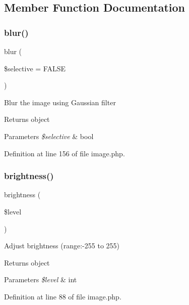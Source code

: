 \subsection{Member Function Documentation}
\hypertarget{class_image_acdca850837eae7c01092f833157ace57}{}\label{class_image_acdca850837eae7c01092f833157ace57} 
\subsubsection{\texorpdfstring{blur()}{blur()}}
{\footnotesize\ttfamily blur (\begin{DoxyParamCaption}\item[{}]{\$selective = {\ttfamily FALSE} }\end{DoxyParamCaption})}

Blur the image using Gaussian filter \begin{DoxyReturn}{Returns}
object 
\end{DoxyReturn}

\begin{DoxyParams}{Parameters}
{\em \$selective} & bool \\
\hline
\end{DoxyParams}


Definition at line 156 of file image.\+php.

\hypertarget{class_image_af571c7cddbd8021822dc8a6c36bd4059}{}\label{class_image_af571c7cddbd8021822dc8a6c36bd4059} 
\subsubsection{\texorpdfstring{brightness()}{brightness()}}
{\footnotesize\ttfamily brightness (\begin{DoxyParamCaption}\item[{}]{\$level }\end{DoxyParamCaption})}

Adjust brightness (range\+:-\/255 to 255) \begin{DoxyReturn}{Returns}
object 
\end{DoxyReturn}

\begin{DoxyParams}{Parameters}
{\em \$level} & int \\
\hline
\end{DoxyParams}


Definition at line 88 of file image.\+php.

